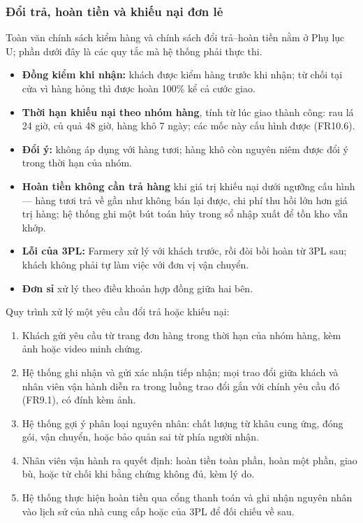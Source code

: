 \subsubsection*{Đổi trả, hoàn tiền và khiếu nại đơn lẻ}
Toàn văn chính sách kiểm hàng và chính sách đổi trả--hoàn tiền nằm ở Phụ lục U; phần dưới đây là các quy tắc mà hệ thống phải thực thi.
\begin{itemize}
    \item \textbf{Đồng kiểm khi nhận:} khách được kiểm hàng trước khi nhận; từ chối tại cửa vì hàng hỏng thì được hoàn 100\% kể cả cước giao.
    \item \textbf{Thời hạn khiếu nại theo nhóm hàng}, tính từ lúc giao thành công: rau lá 24 giờ, củ quả 48 giờ, hàng khô 7 ngày; các mốc này cấu hình được (FR10.6).
    \item \textbf{Đổi ý:} không áp dụng với hàng tươi; hàng khô còn nguyên niêm được đổi ý trong thời hạn của nhóm.
    \item \textbf{Hoàn tiền không cần trả hàng} khi giá trị khiếu nại dưới ngưỡng cấu hình --- hàng tươi trả về gần như không bán lại được, chi phí thu hồi lớn hơn giá trị hàng; hệ thống ghi một bút toán hủy trong sổ nhập xuất để tồn kho vẫn khớp.
    \item \textbf{Lỗi của 3PL:} Farmery xử lý với khách trước, rồi đòi bồi hoàn từ 3PL sau; khách không phải tự làm việc với đơn vị vận chuyển.
    \item \textbf{Đơn sỉ} xử lý theo điều khoản hợp đồng giữa hai bên.
\end{itemize}

Quy trình xử lý một yêu cầu đổi trả hoặc khiếu nại:
\begin{enumerate}
    \item Khách gửi yêu cầu từ trang đơn hàng trong thời hạn của nhóm hàng, kèm ảnh hoặc video minh chứng.
    \item Hệ thống ghi nhận và gửi xác nhận tiếp nhận; mọi trao đổi giữa khách và nhân viên vận hành diễn ra trong luồng trao đổi gắn với chính yêu cầu đó (FR9.1), có đính kèm ảnh.
    \item Hệ thống gợi ý phân loại nguyên nhân: chất lượng từ khâu cung ứng, đóng gói, vận chuyển, hoặc bảo quản sai từ phía người nhận.
    \item Nhân viên vận hành ra quyết định: hoàn tiền toàn phần, hoàn một phần, giao bù, hoặc từ chối khi bằng chứng không đủ, kèm lý do.
    \item Hệ thống thực hiện hoàn tiền qua cổng thanh toán và ghi nhận nguyên nhân vào lịch sử của nhà cung cấp hoặc của 3PL để đối chiếu về sau.
\end{enumerate}

